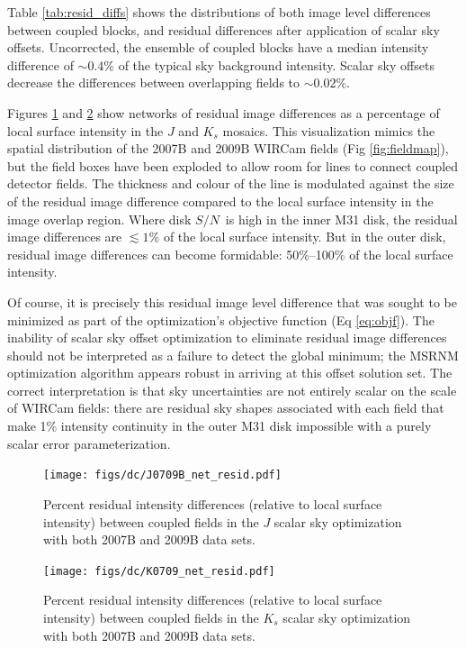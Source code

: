 \documentclass[iop]{emulateapj}
\newcommand{\sn}{\ensuremath{S/N}} %
\begin{document}
Table \ref{tab:resid_diffs} shows the distributions of both image level differences between coupled blocks, and residual differences after application of scalar sky offsets. Uncorrected, the ensemble of coupled blocks have a median intensity difference of $\sim 0.4\%$ of the typical sky background intensity. Scalar sky offsets decrease the differences between overlapping fields to $\sim 0.02\%$.

Figures \ref{fig:J0709B_net_resid} and \ref{fig:K0709B_net_resid} show networks of residual image differences as a percentage of local surface intensity in the $J$ and $K_s$ mosaics. This visualization mimics the spatial distribution of the 2007B and 2009B WIRCam fields (Fig \ref{fig:fieldmap}), but the field boxes have been exploded to allow room for lines to connect coupled detector fields. The thickness and colour of the line is modulated against the size of the residual image difference compared to the local surface intensity in the image overlap region. Where disk \sn\ is high in the inner M31 disk, the residual image differences are $\lesssim 1\%$ of the local surface intensity. But in the outer disk, residual image differences can become formidable: 50\%--100\% of the local surface intensity.

Of course, it is precisely this residual image level difference that was sought to be minimized as part of the optimization's objective function (Eq \ref{eq:objf}). The inability of scalar sky offset optimization to eliminate residual image differences should not be interpreted as a failure to detect the global minimum; the MSRNM optimization algorithm appears robust in arriving at this offset solution set. The correct interpretation is that sky uncertainties are not entirely scalar on the scale of WIRCam fields: there are residual sky shapes associated with each field that make 1\% intensity continuity in the outer M31 disk impossible with a purely scalar error parameterization.

\begin{figure}[p]
	\centering
		\texttt{[image: figs/dc/J0709B\_net\_resid.pdf]}
	\caption[Residual intensity difference network in $J$]{Percent residual intensity differences (relative to local surface intensity) between coupled fields in the $J$ scalar sky optimization with both 2007B and 2009B data sets.}
	\label{fig:J0709B_net_resid}
\end{figure}

\begin{figure}[p]
	\centering
		\texttt{[image: figs/dc/K0709\_net\_resid.pdf]}
	\caption[Residual intensity difference network in $K_s$]{Percent residual intensity differences (relative to local surface intensity) between coupled fields in the $K_s$ scalar sky optimization with both 2007B and 2009B data sets.}
	\label{fig:K0709B_net_resid}
\end{figure}
\end{document}
